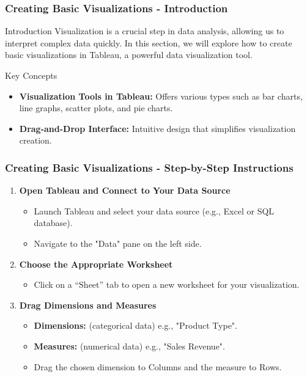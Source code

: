 \documentclass[aspectratio=169]{beamer}
\begin{document}
\begin{frame}[fragile]
    \frametitle{Creating Basic Visualizations - Introduction}
    \begin{block}{Introduction}
        Visualization is a crucial step in data analysis, allowing us to interpret complex data quickly. In this section, we will explore how to create basic visualizations in Tableau, a powerful data visualization tool.
    \end{block}

    \begin{block}{Key Concepts}
        \begin{itemize}
            \item \textbf{Visualization Tools in Tableau:} Offers various types such as bar charts, line graphs, scatter plots, and pie charts.
            \item \textbf{Drag-and-Drop Interface:} Intuitive design that simplifies visualization creation.
        \end{itemize}
    \end{block}
\end{frame}

\begin{frame}[fragile]
    \frametitle{Creating Basic Visualizations - Step-by-Step Instructions}
    \begin{enumerate}
        \item \textbf{Open Tableau and Connect to Your Data Source}
        \begin{itemize}
            \item Launch Tableau and select your data source (e.g., Excel or SQL database).
            \item Navigate to the "Data" pane on the left side.
        \end{itemize}

        \item \textbf{Choose the Appropriate Worksheet}
        \begin{itemize}
            \item Click on a “Sheet” tab to open a new worksheet for your visualization.
        \end{itemize}

        \item \textbf{Drag Dimensions and Measures}
        \begin{itemize}
            \item \textbf{Dimensions:} (categorical data) e.g., "Product Type".
            \item \textbf{Measures:} (numerical data) e.g., "Sales Revenue".
            \item Drag the chosen dimension to Columns and the measure to Rows.
        \end{itemize}
    \end{enumerate}
\end{frame}
\end{document}
